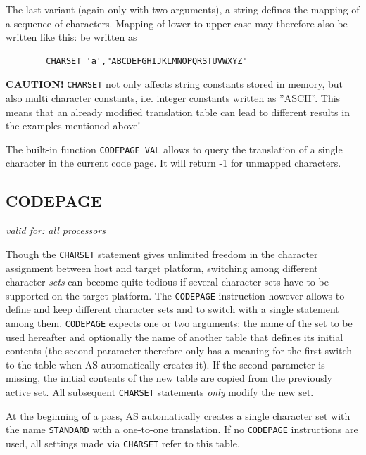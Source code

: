 \documentclass[12pt,twoside]{report}
\makeatletter
\newcommand{\bb}[1]{{\bf #1}}
\newcommand{\tty}[1]{{\tt #1}}
\newcommand{\ttindex}[1]{\index{#1@{\tt #1}}}
\newcommand{\asname}{{AS}}
\makeatother
\begin{document}
The last variant (again only with two arguments), a string defines the
mapping of a sequence of characters.  Mapping of lower to upper case may
therefore also be written like this:
be written as
\begin{verbatim}
        CHARSET 'a',"ABCDEFGHIJKLMNOPQRSTUVWXYZ"
\end{verbatim}

\bb{CAUTION!} \tty{CHARSET} not only affects string constants stored in
memory, but also multi character constants, i.e. integer constants written
as ''ASCII''.  This means that an already modified translation table can
lead to different results in the examples mentioned above!

The built-in function \tty{CODEPAGE\_VAL} allows to query the translation
of a single character in the current code page.  It will return -1 for
unmapped characters.


\subsection{CODEPAGE}
\ttindex{CODEPAGE}

{\em valid for: all processors}

Though the \tty{CHARSET} statement gives unlimited freedom in the
character assignment between host and target platform, switching among
different character {\em sets} can become quite tedious if several
character sets have to be supported on the target platform.  The
\tty{CODEPAGE} instruction however allows to define and keep different
character sets and to switch with a single statement among them.
\tty{CODEPAGE} expects one or two arguments: the name of the set to be
used hereafter and optionally the name of another table that defines its
initial contents (the second parameter therefore only has a meaning for
the first switch to the table when \asname{} automatically creates it).  If the
second parameter is missing, the initial contents of the new table are
copied from the previously active set.  All subsequent \tty{CHARSET}
statements {\em only} modify the new set.

At the beginning of a pass, \asname{} automatically creates a single character
set with the name \tty{STANDARD} with a one-to-one translation.  If no
\tty{CODEPAGE} instructions are used, all settings made via \tty{CHARSET}
refer to this table.

\end{document}

